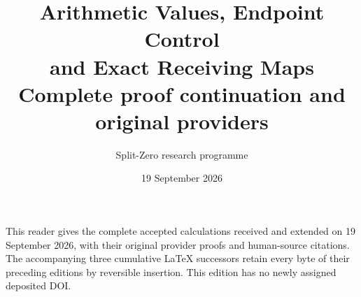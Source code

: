 \documentclass[11pt,a4paper]{article}
\title{Arithmetic Values, Endpoint Control\\and Exact Receiving Maps\\[0.6em]\large Complete proof continuation and original providers}
\author{Split-Zero research programme}
\date{19 September 2026}
\begin{document}
\maketitle
\noindent This reader gives the complete accepted calculations received and
extended on 19 September 2026, with their original provider proofs and
human-source citations. The accompanying three cumulative LaTeX successors
retain every byte of their preceding editions by reversible insertion.
This edition has no newly assigned deposited DOI.
\tableofcontents
\end{document}
